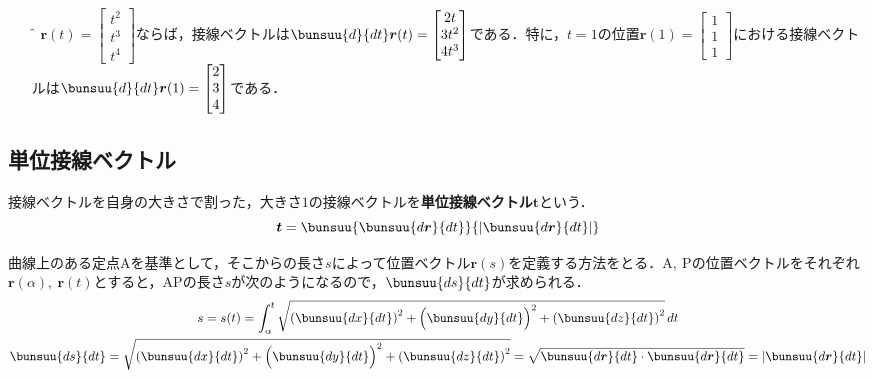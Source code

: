 \begin{enumerate}[leftmargin=18pt, labelsep=10pt, labelsep=10pt, itemindent=9pt]
	\item[\f{例}] $\bm{r}(t) =
		\begin{bmatrix}
			t^2\\ t^3\\ t^4
		\end{bmatrix}
		$ならば，接線ベクトルは$\bunsuu{d}{dt}\bm{r}(t) =
		\begin{bmatrix}
			2t\\ 3t^2\\ 4t^3
		\end{bmatrix}
		$である．特に，$t = 1$の位置$\bm{r}(1) =
		\begin{bmatrix}
			1\\ 1\\ 1
		\end{bmatrix}
		$における接線ベクトルは$\bunsuu{d}{dt}\bm{r}(1) =
		\begin{bmatrix}
			2\\ 3\\ 4
		\end{bmatrix}
		$である．
\end{enumerate}



\subsection{単位接線ベクトル}

接線ベクトルを自身の大きさで割った，大きさ$1$の接線ベクトルを\textbf{単位接線ベクトル}$\bm{t}$という．
\begin{equation}
	\bm{t} = \bunsuu{\bunsuu{d\bm{r}}{dt}}{\left|\bunsuu{d\bm{r}}{dt}\right|} \label{equ:vec_cal-1}
\end{equation}

曲線上のある定点$\mathrm{A}$を基準として，そこからの長さ$s$によって位置ベクトル$\bm{r}(s)$を定義する方法をとる．$\mathrm{A,\ P}$の位置ベクトルをそれぞれ$\bm{r}(\alpha),\ \bm{r}(t)$とすると，$\mathrm{AP}$の長さ$s$が次のようになるので，$\bunsuu{ds}{dt}$が求められる．
\begin{gather}
	s = s(t) = \int_{\alpha}^{t} \sqrt{\left(\bunsuu{dx}{dt}\right)^2 + \Bigl(\bunsuu{dy}{dt}\Bigr)^2 + \left(\bunsuu{dz}{dt}\right)^2}\,dt\\
	\bunsuu{ds}{dt} = \sqrt{\left(\bunsuu{dx}{dt}\right)^2 + \Bigl(\bunsuu{dy}{dt}\Bigr)^2 + \left(\bunsuu{dz}{dt}\right)^2} = \sqrt{\bunsuu{d\bm{r}}{dt} \cdot \bunsuu{d\bm{r}}{dt}} = \left|\bunsuu{d\bm{r}}{dt}\right|
\end{gather}


